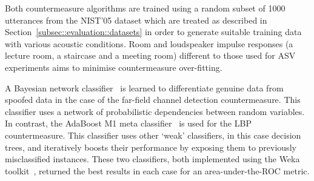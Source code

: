 Both countermeasure algorithms are trained using a random subset of 1000 utterances from the NIST'05 dataset which are treated as described in Section~\ref{subsec::evaluation::datasets} in order to generate suitable training data with various acoustic conditions.  %
Room and loudspeaker impulse responses (a lecture room, a staircase and a meeting room) different to those used for ASV experiments aims to minimise countermeasure over-fitting.

A Bayesian network classifier~\cite{Pearl1988} is learned to differentiate genuine data from spoofed data in the case of the far-field channel detection countermeasure.  This classifier uses a network of probabilistic dependencies between random variables.  In contrast, the AdaBoost M1 meta classifier~\cite{Freund1999} is used for the LBP countermeasure.  This classifier  uses other `weak' classifiers, in this case decision trees, and iteratively boosts their performance by exposing them to previously misclassified instances.  These two classifiers, both implemented using the Weka toolkit~\cite{Weka}, returned the best results in each case for an area-under-the-ROC metric. %


